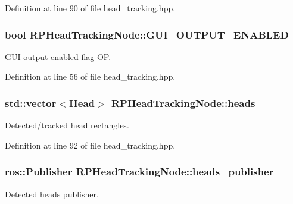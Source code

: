 \-Definition at line 90 of file head\-\_\-tracking.\-hpp.

\hypertarget{class_r_p_head_tracking_node_ae62a4e592ca4c05f2cd232ca745ad5ba}{
\subsubsection[{\-G\-U\-I\-\_\-\-O\-U\-T\-P\-U\-T\-\_\-\-E\-N\-A\-B\-L\-E\-D}]{\setlength{\rightskip}{0pt plus 5cm}bool {\bf \-R\-P\-Head\-Tracking\-Node\-::\-G\-U\-I\-\_\-\-O\-U\-T\-P\-U\-T\-\_\-\-E\-N\-A\-B\-L\-E\-D}}}\label{class_r_p_head_tracking_node_ae62a4e592ca4c05f2cd232ca745ad5ba}
\-G\-U\-I output enabled flag \-O\-P. 

\-Definition at line 56 of file head\-\_\-tracking.\-hpp.

\hypertarget{class_r_p_head_tracking_node_a8f5e4f1e1a4ba7f043b7f35f21a141d2}{
\subsubsection[{heads}]{\setlength{\rightskip}{0pt plus 5cm}std\-::vector$<${\bf \-Head}$>$ {\bf \-R\-P\-Head\-Tracking\-Node\-::heads}}}\label{class_r_p_head_tracking_node_a8f5e4f1e1a4ba7f043b7f35f21a141d2}
\-Detected/tracked head rectangles. 

\-Definition at line 92 of file head\-\_\-tracking.\-hpp.

\hypertarget{class_r_p_head_tracking_node_ae463557050c7ea460f519106bbecaec2}{
\subsubsection[{heads\-\_\-publisher}]{\setlength{\rightskip}{0pt plus 5cm}ros\-::\-Publisher {\bf \-R\-P\-Head\-Tracking\-Node\-::heads\-\_\-publisher}}}\label{class_r_p_head_tracking_node_ae463557050c7ea460f519106bbecaec2}
\-Detected heads publisher. 

